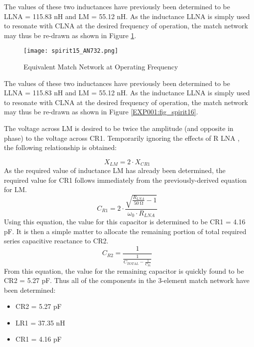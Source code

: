         The values of these two inductances have previously been determined to be LLNA = 115.83 nH and LM = 
        55.12 nH. As the inductance LLNA is simply used to resonate with CLNA at the desired frequency of 
        operation, the match network may thus be re-drawn as shown in Figure \ref{EXP001:fig_spirit15}.

        \begin{figure}[ht!] %
          \centering
          \texttt{[image: spirit15\_AN732.png]}
          \caption{Equivalent Match Network at Operating Frequency}
          \label{EXP001:fig_spirit15}
        \end{figure}
        
        The values of these two inductances have previously been determined to be LLNA = 115.83 nH and LM = 
        55.12 nH. As the inductance LLNA is simply used to resonate with CLNA at the desired frequency of 
        operation, the match network may thus be re-drawn as shown in Figure \ref{EXP001:fig_spirit16}.

        The voltage across LM is desired to be twice the amplitude (and opposite in phase) to the voltage 
        across CR1. Temporarily ignoring the effects of R LNA , the following relationship is obtained:
        
        \begin{equation}\label{EXP001:eq_spirit16}
         X_{LM} = 2\cdot X_{CR1}
        \end{equation}
        As the required value of inductance LM has already been determined, the required value for CR1 
        follows immediately from the previously-derived equation for LM.
        \begin{equation}\label{EXP001:eq_spirit17}
          C_{R1} = 2\cdot\frac{\sqrt{\frac{R_{LNA}}{\qty{50}{\ohm}}-1}}{\omega_0\cdot R_{LNA}}
        \end{equation}
        Using this equation, the value for this capacitor is determined to be CR1 = 4.16 pF. It is then a 
        simple matter to allocate the remaining portion of total required series capacitive reactance to CR2.
        \begin{equation}\label{EXP001:eq_spirit18}
          C_{R2} = \frac{1}{\frac{1}{C_{TOTAL}-\frac{1}{C_{R1}}}}
        \end{equation}
        From this equation, the value for the remaining capacitor is quickly found to be CR2 = 5.27 pF. Thus 
        all of the components in the 3-element match network have been determined:
        \begin{itemize}
          \item CR2 = 5.27 pF
          \item LR1 = 37.35 nH
          \item CR1 = 4.16 pF
        \end{itemize}
        
